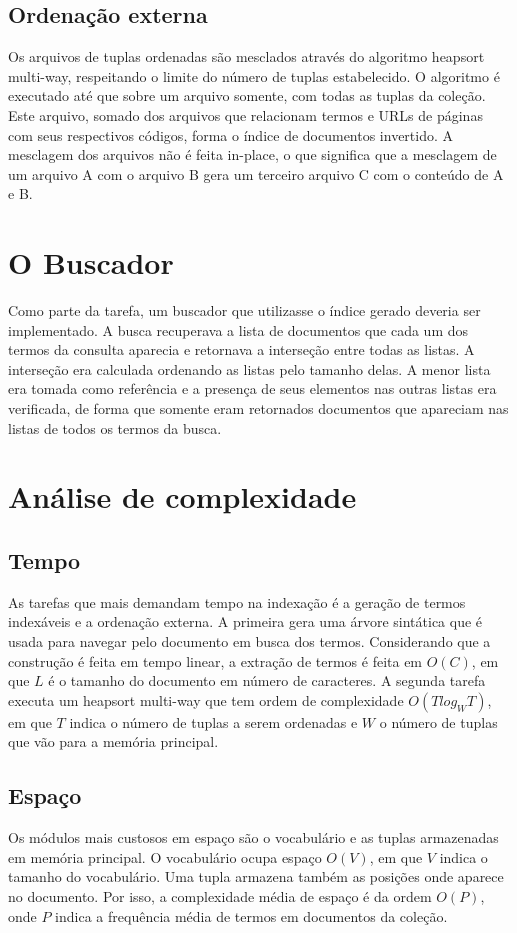 \documentclass[paper=a4, fontsize=11pt]{scrartcl}
\numberwithin{equation}{section}		%
\numberwithin{figure}{section}			%
\numberwithin{table}{section}				%
\begin{document}
\subsection{Ordenação externa}
Os arquivos de tuplas ordenadas são mesclados através do algoritmo heapsort multi-way, respeitando o limite do número de tuplas estabelecido. O algoritmo é executado até que sobre um arquivo somente, com todas as tuplas da coleção. Este arquivo, somado dos arquivos que relacionam termos e URLs de páginas com seus respectivos códigos, forma o índice de documentos invertido. A mesclagem dos arquivos não é feita in-place, o que significa que a mesclagem de um arquivo A com o arquivo B gera um terceiro arquivo C com o conteúdo de A e B.

\section{O Buscador}
Como parte da tarefa, um buscador que utilizasse o índice gerado deveria ser implementado. A busca recuperava a lista de documentos que cada um dos termos da consulta aparecia e retornava a interseção entre todas as listas. A interseção era calculada ordenando as listas pelo tamanho delas. A menor lista era tomada como referência e a presença de seus elementos nas outras listas era verificada, de forma que somente eram retornados documentos que apareciam nas listas de todos os termos da busca.

\section{Análise de complexidade}
\subsection{Tempo}
As tarefas que mais demandam tempo na indexação é a geração de termos indexáveis e a ordenação externa. A primeira gera uma árvore sintática que é usada para navegar pelo documento em busca dos termos. Considerando que a construção é feita em tempo linear, a extração de termos é feita em $O(C)$, em que $L$ é o tamanho do documento em número de caracteres. A segunda tarefa executa um heapsort multi-way que tem ordem de complexidade $O(T log_{W} T)$, em que $T$ indica o número de tuplas a serem ordenadas e $W$ o número de tuplas que vão para a memória principal.

\subsection{Espaço}
Os módulos mais custosos em espaço são o vocabulário e as tuplas armazenadas em memória principal. O vocabulário ocupa espaço $O(V)$, em que $V$ indica o tamanho do vocabulário. Uma tupla armazena também as posições onde aparece no documento. Por isso, a complexidade média de espaço é da ordem $O(P)$, onde $P$ indica a frequência média de termos em documentos da coleção.
\end{document}

